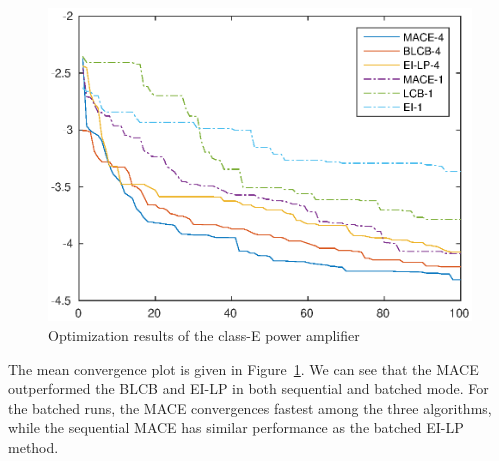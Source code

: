 \begin{figure}[htbp]
\vskip 0.2in
\begin{center}
\centerline{\includegraphics[width=\columnwidth]{./img/ClassE_mean.eps}}
\caption{Optimization results of the class-E power amplifier}
\label{fig:resClassE}
\end{center}
\vskip -0.2in
\end{figure}


The mean convergence plot is given in Figure~\ref{fig:resClassE}. We can see
that the MACE outperformed the BLCB and EI-LP in both sequential and batched
mode. For the batched runs, the MACE convergences fastest among the three
algorithms, while the sequential MACE has similar performance as the batched
EI-LP method.
